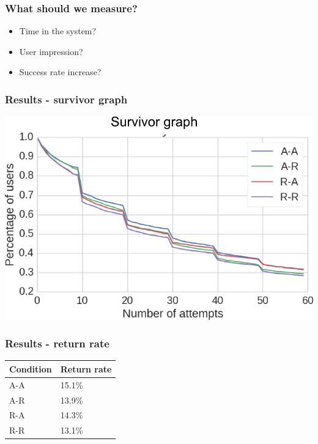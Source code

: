 \documentclass[xcolor=svgnames]{beamer}
\begin{document}
\begin{frame}
	\frametitle{What should we measure?}
  \begin{itemize}
    \item Time in the system? 
    \item User impression? 
    \item Success rate increase?
    \
  \end{itemize}
\end{frame}
\begin{frame}
	\frametitle{Results - survivor graph}
   \includegraphics[width=\textwidth]{img/survivor-hack-raw.png}
\end{frame}
\begin{frame}
	\frametitle{Results - return rate}
\begin{table}
  \centering
  \label{tab:return-prob}
  \begin{tabular}{ll}
    \toprule
    Condition & Return rate \\
    \midrule
    A-A & 	15.1\% \\
    A-R & 	13.9\% \\
    R-A & 	14.3\% \\
    R-R & 	13.1\% \\
    \bottomrule
  \end{tabular}
\end{table}
\end{frame}
\end{document}
